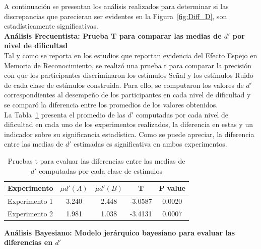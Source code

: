 A continuación se presentan los análisis realizados para determinar si las discrepancias que parecieran ser evidentes en la Figura~\ref{fig:Diff_D}, son estadísticamente significativas.\\

\textbf{Análisis Frecuentista: Prueba T para comparar las medias de $d'$ por nivel de dificultad}\\

Tal y como se reporta en los estudios que reportan evidencia del Efecto Espejo en Memoria de Reconocimiento, se realizó una prueba t para comparar la precisión con que los participantes discriminaron los estímulos Señal y los estímulos Ruido de cada clase de estímulos construida. Para ello, se computaron los valores de $d'$ correspondientes al desempeño de los participantes en cada nivel de dificultad y se comparó la diferencia entre los promedios de los valores obtenidos.\\

La Tabla~\ref{Tabla_t-Dprimas} presenta el promedio de las $d'$ computadas por cada nivel de dificultad en cada uno de los experimentos realizados, la diferencia en estas y un indicador sobre su significancia estadística. Como se puede apreciar, la diferencia entre las medias de $d'$ estimadas es significativa en ambos experimentos.\\

\begin{table}
\caption[Prueba t para evaluar las diferencias entre las medias de $d'$ por clase de estímulos]{Pruebas t para evaluar las diferencias entre las medias de $d'$ computadas por cada clase de estímulos}
\label{Tabla_t-Dprimas}
\centering
\begin{tabular}{l | c c c c}
\toprule
\textbf{Experimento} & \textbf{$\mu d'(A)$} & \textbf{$\mu d'(B)$} & \textbf{T}  & \textbf{P value}\\
\midrule
Experimento 1 & 3.240 & 2.448 & -3.0587 & 0.0020 \\
Experimento 2 & 1.981 & 1.038 & -3.4131 & 0.0007 \\
\bottomrule
\end{tabular}
\end{table}


\textbf{Análisis Bayesiano: Modelo jerárquico bayesiano para evaluar las diferencias en $d'$}\\

